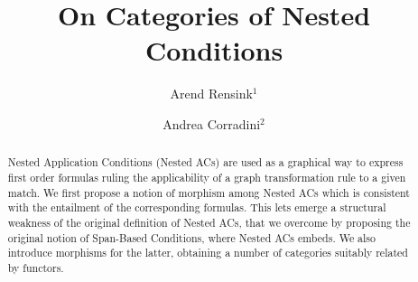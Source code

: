 \title{On Categories of Nested Conditions}

\author{Arend Rensink$^1$ \and Andrea Corradini$^2$}

\maketitle

\begin{abstract}
Nested Application Conditions (Nested ACs) are used as a graphical way to express first order formulas ruling the applicability of a graph transformation rule to a given match. We first propose a notion of morphism among Nested ACs which is consistent with the entailment of the corresponding formulas. This lets emerge
a structural weakness of the original definition of Nested ACs, that we overcome by proposing the original notion of Span-Based Conditions, where Nested ACs embeds. We also introduce morphisms for the latter, obtaining a number of categories suitably related by functors.
\end{abstract}
